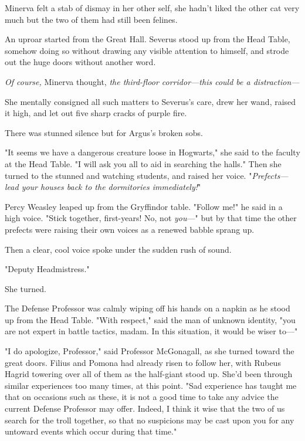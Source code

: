 Minerva felt a stab of dismay in her other self, she hadn't liked the other cat 
very much but the two of them had still been felines.

An uproar started from the Great Hall. Severus stood up from the Head Table, 
somehow doing so without drawing any visible attention to himself, and strode 
out the huge doors without another word.

\emph{Of course,} Minerva thought, \emph{the third-floor corridor---this could 
be a distraction---}

She mentally consigned all such matters to Severus's care, drew her wand, 
raised it high, and let out five sharp cracks of purple fire.

There was stunned silence but for Argus's broken sobs.

"It seems we have a dangerous creature loose in Hogwarts," she said to the 
faculty at the Head Table. "I will ask you all to aid in searching the halls." 
Then she turned to the stunned and watching students, and raised her voice. 
"\emph{Prefects---lead your houses back to the dormitories immediately!}"

Percy Weasley leaped up from the Gryffindor table. "Follow me!" he said in a 
high voice. "Stick together, first-years! No, not \emph{you}---" but by that 
time the other prefects were raising their own voices as a renewed babble 
sprang up.

Then a clear, cool voice spoke under the sudden rush of sound.

"Deputy Headmistress."

She turned.

The Defense Professor was calmly wiping off his hands on a napkin as he stood 
up from the Head Table. "With respect," said the man of unknown identity, "you 
are not expert in battle tactics, madam. In this situation, it would be wiser 
to---"

"I do apologize, Professor," said Professor McGonagall, as she turned toward 
the great doors. Filius and Pomona had already risen to follow her, with Rubeus 
Hagrid towering over all of them as the half-giant stood up. She'd been through 
similar experiences too many times, at this point. "Sad experience has taught 
me that on occasions such as these, it is not a good time to take any advice 
the current Defense Professor may offer. Indeed, I think it wise that the two 
of us search for the troll together, so that no suspicions may be cast upon you 
for any untoward events which occur during that time."

